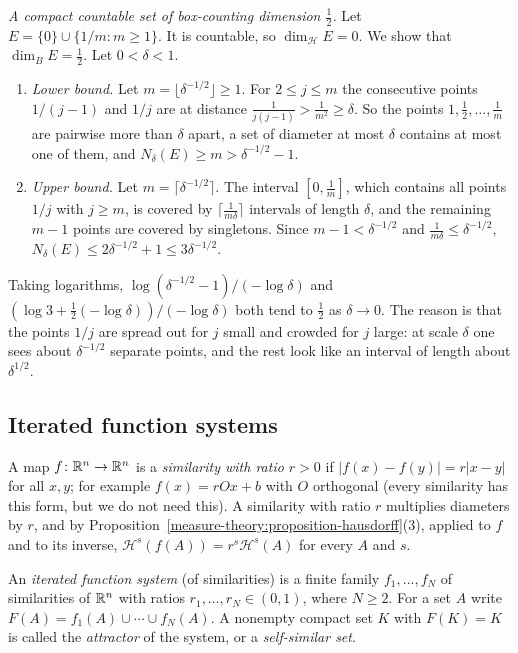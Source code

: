 \begin{example}\label{measure-theory:example-box-hausdorff}
\emph{A compact countable set of box-counting dimension $\frac12$.} Let $E = \{0\} \cup \{1/m : m \geq 1\}$. It is countable, so $\dim_{\mathcal{H}}E = 0$. We show that $\dim_BE = \frac12$. Let
$0 < \delta < 1$.
\begin{enumerate}
\item \emph{Lower bound.} Let $m = \lfloor\delta^{-1/2}\rfloor \geq 1$. For $2 \leq j \leq m$ the consecutive points $1/(j-1)$ and $1/j$ are at distance
$\frac1{j(j-1)} > \frac1{m^2} \geq \delta$. So the points $1, \frac12, \ldots, \frac1m$ are pairwise more than $\delta$ apart, a set of diameter at most $\delta$ contains at most one of them, and
$N_\delta(E) \geq m > \delta^{-1/2} - 1$.
\item \emph{Upper bound.} Let $m = \lceil\delta^{-1/2}\rceil$. The interval $[0, \frac1m]$, which contains all points $1/j$ with $j \geq m$, is covered by $\lceil\frac1{m\delta}\rceil$ intervals of
length $\delta$, and the remaining $m - 1$ points are covered by singletons. Since $m - 1 < \delta^{-1/2}$ and $\frac1{m\delta} \leq \delta^{-1/2}$, $N_\delta(E) \leq 2\delta^{-1/2} + 1 \leq 3\delta^{-1/2}$.
\end{enumerate}
Taking logarithms, $\log(\delta^{-1/2} - 1)/(-\log\delta)$ and $(\log 3 + \frac12(-\log\delta))/(-\log\delta)$ both tend to $\frac12$ as $\delta \to 0$. The reason is that the points $1/j$ are spread
out for $j$ small and crowded for $j$ large: at scale $\delta$ one sees about $\delta^{-1/2}$ separate points, and the rest look like an interval of length about $\delta^{1/2}$.
\end{example}

\subsection{Iterated function systems}\label{measure-theory:subsection-iterated-function-systems}

A map $f \colon \mathbb{R}^n \to \mathbb{R}^n$ is a \emph{similarity with ratio $r > 0$} if $|f(x) - f(y)| = r|x - y|$ for all $x, y$; for example $f(x) = rOx + b$ with $O$ orthogonal (every similarity has this
form, but we do not need this). A similarity with ratio $r$ multiplies diameters by $r$, and by Proposition~\ref{measure-theory:proposition-hausdorff}(3), applied to $f$ and to its inverse,
$\mathcal{H}^s(f(A)) = r^s\mathcal{H}^s(A)$ for every $A$ and $s$.

\begin{definition}\label{measure-theory:definition-ifs}
An \emph{iterated function system} (of similarities) is a finite family $f_1, \ldots, f_N$ of similarities of $\mathbb{R}^n$ with ratios $r_1, \ldots, r_N \in (0, 1)$, where $N \geq 2$. For a set $A$ write
$F(A) = f_1(A) \cup \cdots \cup f_N(A)$. A nonempty compact set $K$ with $F(K) = K$ is called the \emph{attractor} of the system, or a \emph{self-similar set}.
\end{definition}

